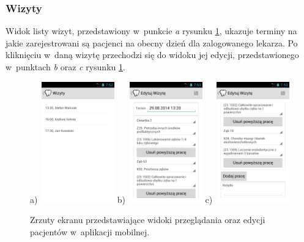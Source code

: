 \documentclass[11pt]{aghdpl}
\begin{document}
\subsubsection{Wizyty}
\label{sec:wizytyMobile}

Widok listy wizyt, przedstawiony w~punkcie \emph{a} rysunku \ref{fig:wizytyMobile}, ukazuje terminy na jakie zarejestrowani są pacjenci na obecny dzień dla zalogowanego lekarza. Po kliknięciu w~daną wizytę przechodzi się do widoku jej edycji, przedstawionego w~punktach \emph{b} oraz \emph{c} rysunku \ref{fig:wizytyMobile}.

\begin{figure}[h!]
	\begin{center}
		a)~\includegraphics[width=0.28\textwidth]{wizytyMobile}
		\hspace{5mm}
		b)~\includegraphics[width=0.28\textwidth]{wizyta1Mobile}
		\hspace{5mm}
		c)~\includegraphics[width=0.28\textwidth]{wizyta2Mobile}
	\end{center}
	\caption{Zrzuty ekranu przedstawiające widoki przeglądania oraz edycji pacjentów w~aplikacji mobilnej.}
	\label{fig:wizytyMobile}
\end{figure}
\end{document}
